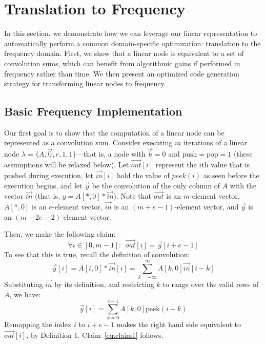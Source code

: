 \section{Translation to Frequency}
\label{sec:freq}

In this section, we demonstrate how we can leverage our linear
representation to automatically perform a common domain-specific
optimization: translation to the frequency domain.  First, we show
that a linear node is equivalent to a set of convolution sums, which
can benefit from algorithmic gains if performed in frequency rather
than time.  We then present an optimized code generation strategy for
transforming linear nodes to frequency.

\subsection{Basic Frequency Implementation}


Our first goal is to show that the computation of a linear node can be
represented as a convolution sum.  Consider executing $m$ iterations
of a linear node $\lambda = \{A, {\vec 0}, e, 1, 1\}$---that is, a
node with $\vec{b} = 0$ and $\mbox{push}=\mbox{pop}=1$ (these assumptions
will be relaxed below).  Let $\vec{out}[i]$ represent the $i$th value
that is pushed during execution, let $\vec{in}[i]$ hold the value of
$peek(i)$ as seen before the execution begins, and let ${\vec y}$ be
the convolution of the only column of $A$ with the vector $\vec{in}$
(that is, $y = A[*,0] * {\vec{in}}$).  Note that $\vec{out}$ is an
$m$-element vector, $A[*,0]$ is an $e$-element vector, ${\vec{in}}$ is
an $(m+e-1)$-element vector, and ${\vec y}$ is an $(m+2e-2)$-element
vector.

Then, we make the following claim:
\begin{equation}
\label{eq:claim1}
\forall i \in [0, m-1]:~~{\vec{out}}[i] = {\vec y}[i+e-1]
\end{equation}
To see that this is true, recall the definition of convolution:
\[
  {\vec y}[i] = A[i,0] * \vec{in}[i] = \sum_{k=-\infty}^{\infty} A[k,0] \vec{in}[i-k]
\]
Substituting $\vec{in}$ by its definition, and restricting $k$ to
range over the valid rows of $A$, we have:
\[
  {\vec y}[i] = \sum_{k=0}^{e-1} A[k,0] \mbox{peek}(i-k)
\]
Remapping the index $i$ to $i+e-1$ makes the right hand side
equivalent to ${\vec{out}}[i]$, by Definition 1.
Claim~\ref{eq:claim1} follows.

